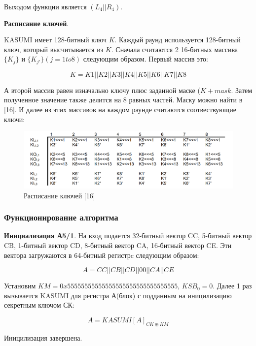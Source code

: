 \documentclass[colorthm]{./civarticle}
\begin{document}
Выходом функции является $(L_4||R_4)$.

\textbf{Расписание ключей}.

KASUMI имеет 128-битный ключ $K$. Каждый раунд используется 128-битный ключ, который высчитывается из $K$. Сначала считаются 2 16-битных массива $\{K_j\}$ и $\{K_{j'}\} (j=1 to 8)$ следующим образом. Первый массив это:

\begin{equation}
    K=K1||K2||K3||K4||K5||K6||K7||K8
\end{equation}

А второй массив равен изначально ключу плюс заданной маске ($K + mask$. Затем полученное значение также делится на 8 равных частей. Маску можно найти в [16]. И далее из этих массивов на каждом раунде считаются соотвествующие ключи: 

\begin{figure}[H]
    \centering
    \includegraphics[width=0.75\linewidth]{Снимок экрана 2024-01-11 152806.png}
    \caption{Расписание ключей [16]}
    \label{fig:enter-label}
\end{figure}

\subsubsection{Функционирование алгоритма}

\textbf{Инициализация А5/1}. На вход подается 32-битный вектор CC, 5-битный вектор CB, 1-битный вектор CD, 8-битный вектор CA, 16-битный вектор CE. Эти вектора загружаются в 64-битный регистрc следующим образом: 

\begin{equation}
    A = CC||CB||CD||00||CA||CE
\end{equation}

Установим $KM = 0x55555555555555555555555555555555$, $KSB_0 = 0$. Далее 1 раз вызывается KASUMI для регистра А(блок) с подданным на иницилизацию секретным ключом СК:

\begin{equation}
    A = KASUMI[A]_{CK \oplus KM}
\end{equation}

Иницилизация завершена.
\end{document}
